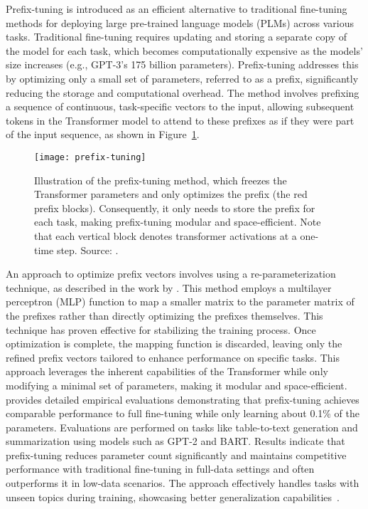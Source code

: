 Prefix-tuning is introduced as an efficient alternative to traditional fine-tuning methods for deploying large pre-trained language models (PLMs) across various tasks.
Traditional fine-tuning requires updating and storing a separate copy of the model for each task, which becomes computationally expensive as the models' size increases (e.g., GPT-3's 175 billion parameters).
Prefix-tuning addresses this by optimizing only a small set of parameters, referred to as a prefix, significantly reducing the storage and computational overhead.
The method involves prefixing a sequence of continuous, task-specific vectors to the input, allowing subsequent tokens in the Transformer model to attend to these prefixes as if they were part of the input sequence, as shown in Figure~\ref{fig:prefix-tuning}.
\begin{figure}[H]
	\centering
	\texttt{[image: prefix-tuning]}
	\caption{Illustration of the prefix-tuning method, which freezes the Transformer parameters and only optimizes the prefix (the red prefix blocks). Consequently, it only needs to store the prefix for each task, making prefix-tuning modular and space-efficient. Note that each vertical block denotes transformer activations at a one-time step. Source: \textcite{li2021prefixtuning}.}
	\label{fig:prefix-tuning}
\end{figure}
An approach to optimize prefix vectors involves using a re-parameterization technique, as described in the work by \textcite{li2021prefixtuning}.
This method employs a multilayer perceptron (MLP) function to map a smaller matrix to the parameter matrix of the prefixes rather than directly optimizing the prefixes themselves.
This technique has proven effective for stabilizing the training process.
Once optimization is complete, the mapping function is discarded, leaving only the refined prefix vectors tailored to enhance performance on specific tasks.
This approach leverages the inherent capabilities of the Transformer while only modifying a minimal set of parameters, making it modular and space-efficient.
\textcite{li2021prefixtuning} provides detailed empirical evaluations demonstrating that prefix-tuning achieves comparable performance to full fine-tuning while only learning about 0.1\% of the parameters.
Evaluations are performed on tasks like table-to-text generation and summarization using models such as GPT-2 and BART\@.
Results indicate that prefix-tuning reduces parameter count significantly and maintains competitive performance with traditional fine-tuning in full-data settings and often outperforms it in low-data scenarios.
The approach effectively handles tasks with unseen topics during training, showcasing better generalization capabilities~\cite{lewis2020bart}.


